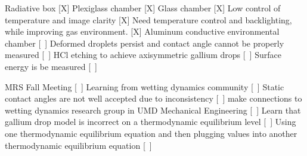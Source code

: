 \begin{outline}[enumerate]
	\1 Radiative box [X]
		\2 Plexiglass chamber [X]
		\2 Glass chamber [X]
		\2 Low control of temperature and image clarity [X]
			\3 Need temperature control and backlighting, while improving gas environment. [X]
	\1 Aluminum conductive environmental chamber [~]
		\2 Deformed droplets persist and contact angle cannot be properly measured [~]
		\2 HCl etching to achieve axisymmetric gallium drops [~]
		\2 Surface energy is be measured [~]
		
	\1 MRS Fall Meeting [~]
		\2 Learning from wetting dynamics community [~]
			\3 Static contact angles are not well accepted due to inconsistency  [~]
			\3 make connections to wetting dynamics research group in UMD Mechanical Engineering [~] 
			\3 Learn that gallium drop model is incorrect on a thermodynamic equilibrium level [~]
				\4 Using one thermodynamic equilibrium equation and then plugging values into another thermodynamic equilibrium equation [~]
		
\end{outline}
